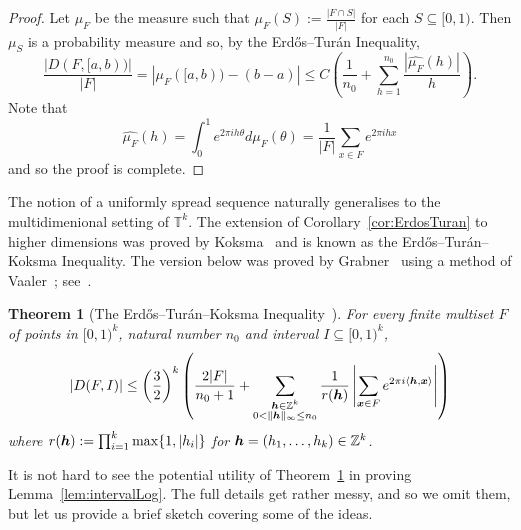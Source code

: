 \documentclass[12pt,a4paper]{amsart}
\numberwithin{equation}{section}
\newtheorem{theorem}[equation]{Theorem}
\theoremstyle{definition}
\begin{document}
\begin{proof}
Let $\mu_F$ be the measure such that $\mu_F(S):=\frac{|F\cap S|}{|F|}$ for each $S\subseteq [0,1)$. Then $\mu_S$ is a probability measure and so, by the Erd\H{o}s--Tur\'{a}n Inequality,
\[\frac{|D(F,[a,b))|}{|F|} = |\mu_F([a,b)) - (b-a)|\leq C\left(\frac{1}{n_0} + \sum_{h=1}^{n_0}\frac{|\hat{\mu_F}(h)|}{h}\right).\]
Note that
\[\hat{\mu_F}(h) = \int_0^1e^{2\pi i h\theta}d\mu_F(\theta) = \frac{1}{|F|}\sum_{x\in F}e^{2\pi i h x}\]
and so the proof is complete.
\end{proof}

The notion of a uniformly spread sequence  naturally generalises to the multidimenional setting of $\mathbb{T}^k$. The extension of Corollary~\ref{cor:ErdosTuran} to higher dimensions was proved by Koksma~\cite{Koksma50} and is known as the Erd\H{o}s--Tur\'an--Koksma Inequality. The version below was proved by Grabner~\cite{Grabner91} using a method of Vaaler~\cite{Vaaler85}; see~\cite[Theorem 1.21]{DrmotaTicky97}.


\begin{theorem}[The Erd\H{o}s--Tur\'{a}n--Koksma Inequality~\cite{ErdosTuran48I,ErdosTuran48II,Koksma50}]
\label{th:ErdosTuranKoksma}
For every finite multiset $F$ of points in $[0,1)^k$, natural number $n_0$ and interval $I\subseteq [0,1)^k$,
\[|D(F,I)|\leq \left(\frac{3}{2}\right)^k\left(\frac{2|F|}{n_0+1} + \sum_{\substack{\boldsymbol{h}\in \mathbb{Z}^k\\ 0<\|\boldsymbol{h}\|_\infty\leq n_0}}\frac{1}{r(\boldsymbol{h})}\left|\sum_{\boldsymbol{x}\in F}e^{2\pi i \langle \boldsymbol{h},\boldsymbol{x}\rangle}\right|\right)\] 
where $r(\boldsymbol{h}):=\prod_{i=1}^k\max\{1,|h_i|\}$ for $\boldsymbol{h}=(h_1,\dots,h_k)\in \mathbb{Z}^k$. 
\end{theorem}

It is not hard to see the potential utility of  Theorem~\ref{th:ErdosTuranKoksma} in proving Lemma~\ref{lem:intervalLog}. The full details get rather messy, and so we omit them, but let us provide a brief sketch covering some of the ideas. 
\end{document}
